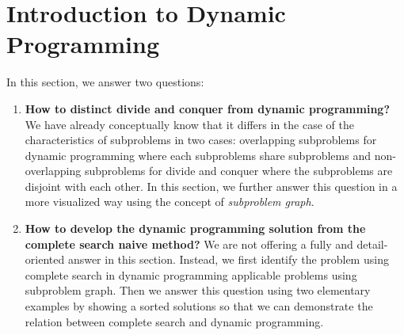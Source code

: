 \documentclass[../main.tex]{subfiles}
\begin{document}

\section{Introduction to Dynamic Programming}
\label{dynamic_programming_sec_search}
In this section, we answer two questions:
\begin{enumerate}
    \item \textbf{How to distinct divide and conquer from dynamic programming?} We have already conceptually know that it differs in the case of the characteristics of subproblems in two cases: overlapping subproblems for dynamic programming where each subproblems share subproblems and non-overlapping subproblems for divide and conquer where the subproblems are disjoint with each other. In this section, we further answer this question in a more visualized way using the concept of \textit{subproblem graph}. 
    \item \textbf{How to develop the dynamic programming solution from the complete search naive method? } We are not offering a fully and detail-oriented answer in this section. Instead, we first identify the problem using complete search in dynamic programming applicable problems using subproblem graph. Then we answer this question using two elementary examples by showing a sorted solutions so that we can demonstrate the relation between complete search and dynamic programming.
\end{enumerate}
\end{document}

